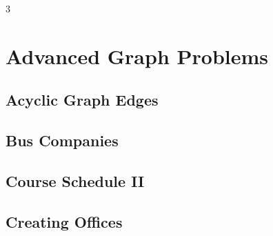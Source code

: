 \documentclass[8pt]{extarticle}
\begin{document}
\pagebreak
\begin{multicols*}{3}

\section{Advanced Graph Problems}

\subsection{Acyclic Graph Edges}
\begin{caixaenunciado}

\end{caixaenunciado}
\vspace{0.3cm}


\subsection{Bus Companies}
\begin{caixaenunciado}

\end{caixaenunciado}
\vspace{0.3cm}


\subsection{Course Schedule II}
\begin{caixaenunciado}

\end{caixaenunciado}
\vspace{0.3cm}


\subsection{Creating Offices}
\begin{caixaenunciado}

\end{caixaenunciado}
\vspace{0.3cm}



\end{multicols*}
\end{document}
